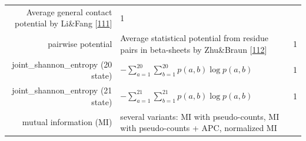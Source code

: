 \documentclass[12pt,a4paper,twoside]{book}
\theoremstyle{definition}
\theoremstyle{definition}
\theoremstyle{remark}
\begin{document}
\begin{longtable}[]{@{}rlc@{}}
\begin{minipage}[t]{0.50\columnwidth}
Average general contact potential by Li\&Fang
{[}\protect\hyperlink{ref-Li2011}{111}{]}\strut
\end{minipage} & \begin{minipage}[t]{0.18\columnwidth}\centering\strut
1\strut
\end{minipage}\tabularnewline
\begin{minipage}[t]{0.23\columnwidth}\raggedleft\strut
pairwise potential\strut
\end{minipage} & \begin{minipage}[t]{0.50\columnwidth}\raggedright\strut
Average statistical potential from residue pairs in beta-sheets by
Zhu\&Braun {[}\protect\hyperlink{ref-Zhu1999}{112}{]}\strut
\end{minipage} & \begin{minipage}[t]{0.18\columnwidth}\centering\strut
1\strut
\end{minipage}\tabularnewline
\begin{minipage}[t]{0.23\columnwidth}\raggedleft\strut
joint\_shannon\_entropy (20 state)\strut
\end{minipage} & \begin{minipage}[t]{0.50\columnwidth}\raggedright\strut
\(- \sum_{a=1}^{20}\sum_{b=1}^{20} p(a,b) \log p(a,b)\)\strut
\end{minipage} & \begin{minipage}[t]{0.18\columnwidth}\centering\strut
1\strut
\end{minipage}\tabularnewline
\begin{minipage}[t]{0.23\columnwidth}\raggedleft\strut
joint\_shannon\_entropy (21 state)\strut
\end{minipage} & \begin{minipage}[t]{0.50\columnwidth}\raggedright\strut
\(- \sum_{a=1}^{21}\sum_{b=1}^{21} p(a,b) \log p(a,b)\)\strut
\end{minipage} & \begin{minipage}[t]{0.18\columnwidth}\centering\strut
1\strut
\end{minipage}\tabularnewline
\begin{minipage}[t]{0.23\columnwidth}\raggedleft\strut
mutual information (MI)\strut
\end{minipage} & \begin{minipage}[t]{0.50\columnwidth}\raggedright\strut
several variants: MI with pseudo-counts, MI with pseudo-counts + APC,
normalized MI\strut
\end{minipage} & \begin{minipage}[t]{0.18\columnwidth}\centering\strut

\end{minipage}
\end{longtable}
\end{document}

